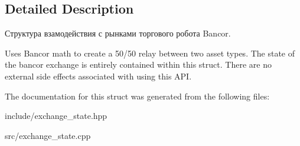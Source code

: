 \subsection{Detailed Description}
Структура взамодействия с рынками торгового робота Bancor. 

Uses Bancor math to create a 50/50 relay between two asset types. The state of the bancor exchange is entirely contained within this struct. There are no external side effects associated with using this A\+PI. 

The documentation for this struct was generated from the following files\+:\begin{DoxyCompactItemize}
\item 
include/exchange\+\_\+state.\+hpp\item 
src/exchange\+\_\+state.\+cpp\end{DoxyCompactItemize}
